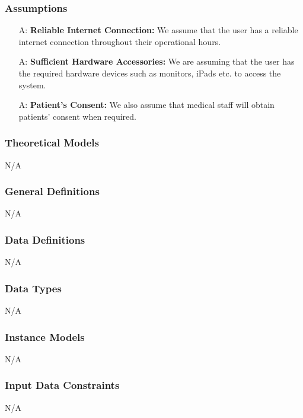 \documentclass[12pt]{article}
\newcounter{assumpnum} %
\begin{document}
\subsubsection{Assumptions} \label{sec_assumpt}

\begin{itemize}
  \item[A\refstepcounter{assumpnum}\theassumpnum \label{A_reliableInternet}:] \textbf{Reliable Internet Connection:} We assume that the user has a reliable internet connection throughout their operational hours.
  \item[A\refstepcounter{assumpnum}\theassumpnum \label{A_sufficientHardware}:] \textbf{Sufficient Hardware Accessories:} We are assuming that the user has the required hardware devices such as monitors, iPads etc. to access the system.
  \item[A\refstepcounter{assumpnum}\theassumpnum \label{A_patientConsent}:] \textbf{Patient’s Consent:} We also assume that medical staff will obtain patients’ consent when required.
\end{itemize}


\subsubsection{Theoretical Models}\label{sec_theoretical}
N/A

\subsubsection{General Definitions} \label{sec_GeneralDefinitions}
N/A

\subsubsection{Data Definitions}\label{sec_DataDefinitions} 
N/A

\subsubsection{Data Types}\label{sec_DataTypes}
N/A

\subsubsection{Instance Models} \label{sec_InstanceModels} 
N/A

\subsubsection{Input Data Constraints} \label{sec_InputDataConstraints}
N/A
\end{document}
